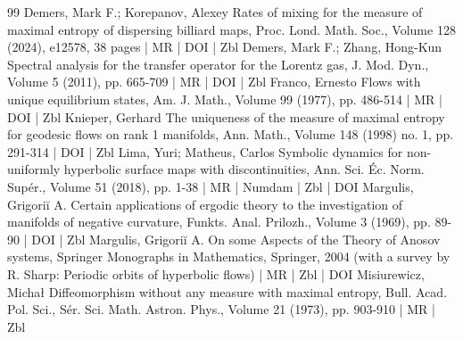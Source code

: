 \begin{thebibliography}{99}
Demers, Mark F.; Korepanov, Alexey Rates of mixing for the measure of maximal entropy of dispersing billiard maps, Proc. Lond. Math. Soc., Volume 128 (2024), e12578, 38 pages | MR | DOI | Zbl
Demers, Mark F.; Zhang, Hong-Kun Spectral analysis for the transfer operator for the Lorentz gas, J. Mod. Dyn., Volume 5 (2011), pp. 665-709 | MR | DOI | Zbl
Franco, Ernesto Flows with unique equilibrium states, Am. J. Math., Volume 99 (1977), pp. 486-514 | MR | DOI | Zbl
Knieper, Gerhard The uniqueness of the measure of maximal entropy for geodesic flows on rank 1 manifolds, Ann. Math., Volume 148 (1998) no. 1, pp. 291-314 | DOI | Zbl
Lima, Yuri; Matheus, Carlos Symbolic dynamics for non-uniformly hyperbolic surface maps with discontinuities, Ann. Sci. Éc. Norm. Supér., Volume 51 (2018), pp. 1-38 | MR | Numdam | Zbl | DOI
Margulis, Grigoriĭ A. Certain applications of ergodic theory to the investigation of manifolds of negative curvature, Funkts. Anal. Prilozh., Volume 3 (1969), pp. 89-90 | DOI | Zbl
Margulis, Grigoriĭ A. On some Aspects of the Theory of Anosov systems, Springer Monographs in Mathematics, Springer, 2004 (with a survey by R. Sharp: Periodic orbits of hyperbolic flows) | MR | Zbl | DOI
Misiurewicz, Michał Diffeomorphism without any measure with maximal entropy, Bull. Acad. Pol. Sci., Sér. Sci. Math. Astron. Phys., Volume 21 (1973), pp. 903-910 | MR | Zbl
\end{thebibliography}

